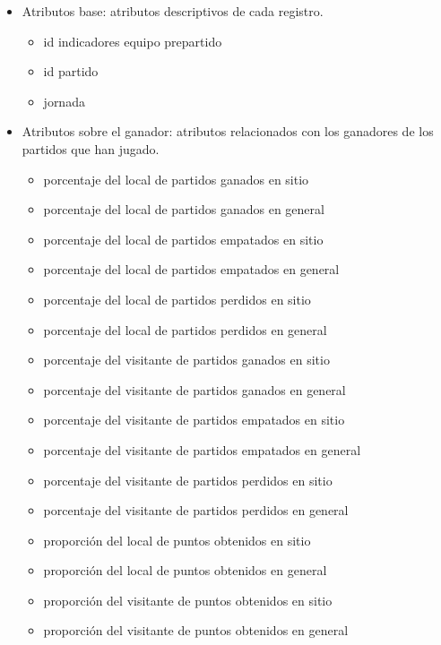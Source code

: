 \begin{itemize}
    \item Atributos base: atributos descriptivos de cada registro.
          \begin{itemize}
              \item id indicadores equipo prepartido
              \item id partido
              \item jornada
          \end{itemize}
    \item Atributos sobre el ganador: atributos relacionados con los ganadores de los partidos que han jugado.
          \begin{itemize}
              \item porcentaje del local de partidos ganados en sitio
              \item porcentaje del local de partidos ganados en general
              \item porcentaje del local de partidos empatados en sitio
              \item porcentaje del local de partidos empatados en general
              \item porcentaje del local de partidos perdidos en sitio
              \item porcentaje del local de partidos perdidos en general
              \item porcentaje del visitante de partidos ganados en sitio
              \item porcentaje del visitante de partidos ganados en general
              \item porcentaje del visitante de partidos empatados en sitio
              \item porcentaje del visitante de partidos empatados en general
              \item porcentaje del visitante de partidos perdidos en sitio
              \item porcentaje del visitante de partidos perdidos en general
              \item proporción del local de puntos obtenidos en sitio
              \item proporción del local de puntos obtenidos en general
              \item proporción del visitante de puntos obtenidos en sitio
              \item proporción del visitante de puntos obtenidos en general
          \end{itemize}

\end{itemize}
